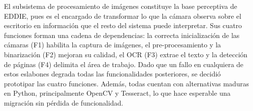 El subsistema de procesamiento de imágenes constituye la base perceptiva de EDDIE, pues es el encargado de transformar lo que la cámara observa sobre el escritorio en información que el resto del sistema puede interpretar. Sus cuatro funciones forman una cadena de dependencias: la correcta inicialización de las cámaras (F1) habilita la captura de imágenes, el pre-procesamiento y la binarización (F2) mejoran su calidad, el OCR (F3) extrae el texto y la detección de páginas (F4) delimita el área de trabajo. Dado que un fallo en cualquiera de estos eslabones degrada todas las funcionalidades posteriores, se decidió prototipar las cuatro funciones. Además, todas cuentan con alternativas maduras en Python, principalmente OpenCV y Tesseract, lo que hace esperable una migración sin pérdida de funcionalidad.
 
